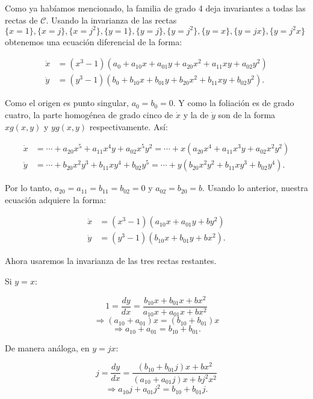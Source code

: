 Como ya habíamos mencionado, la familia de grado 4 deja invariantes a todas las rectas de $\mathcal{C}$. Usando la invarianza de las rectas  $\{x=1\}, \{x=j\}, \{x=j^{2}\}, \{y=1\}, \{y=j\}, \{y=j^{2}\}, \{y=x\}, \{y=jx\}, \{y=j^{2}x\}$ obtenemos una ecuación diferencial de la forma:



\begin{align*}
\dot{x} & =(x^{3}-1)(a_{0} + a_{10}x + a_{01}y + a_{20}x^{2} + a_{11}xy + a_{02}y^{2}) \\
\dot{y} & =(y^{3}-1)(b_{0} + b_{10}x + b_{01}y + b_{20}x^{2} + b_{11}xy + b_{02}y^{2}).
\end{align*}



Como el origen es punto singular, $a_{0}=b_{0}=0$. Y como la foliación es de grado cuatro, la parte homogénea de grado cinco de $\dot{x}$ y la de $\dot{y}$ son de la forma $xg(x,y)$ y $yg(x,y)$ respectivamente. Así:


\begin{align*}
\dot{x}& =\cdots+a_{20}x^{5} + a_{11}x^{4}y + a_{02}x^{5}y^{2} =\cdots+x(a_{20}x^{4} + a_{11}x^{3}y + a_{02}x^{2}y^{2}) \\
\dot{y}& =\cdots+b_{20}x^{2}y^{3} + b_{11}xy^{4} + b_{02}y^{5} =\cdots+y(b_{20}x^{2}y^{2} + b_{11}xy^{3} + b_{02}y^{4}) .
\end{align*}

Por lo tanto, $a_{20}=a_{11}=b_{11}=b_{02}=0$ y $a_{02}=b_{20}=b$. Usando lo anterior, nuestra ecuación adquiere la forma:


\begin{align*} 
\dot{x}&=(x^{3}-1)(a_{10}x + a_{01}y + by^{2}) \\
\dot{y}&=(y^{3}-1)(b_{10}x + b_{01}y + bx^{2}).
\end{align*}

Ahora usaremos la invarianza de las tres rectas restantes.

Si $y=x$:

$$ 1 = \frac{dy}{dx} = \frac{b_{10}x + b_{01}x + bx^{2}}{a_{10}x + a_{01}x + bx^{2}}$$
$$\Rightarrow (a_{10} + a_{01})x = (b_{10} + b_{01})x$$
\begin{equation}
\label{temp1}
\Rightarrow a_{10}+a_{01}=b_{10}+b_{01}.
\end{equation}

De manera análoga, en $y=jx$:

$$j = \frac{dy}{dx} = \frac{(b_{10}+b_{01}j)x + bx^{2}}{(a_{10}+a_{01}j)x + bj^{2}x^{2}}$$
\begin{equation}
\label{temp2}
\Rightarrow a_{10}j + a_{01}j^{2} = b_{10} + b_{01}j.
\end{equation}

